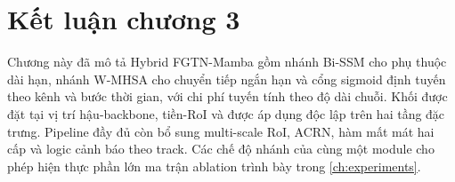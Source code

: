 \section*{Kết luận chương 3}

Chương này đã mô tả Hybrid FGTN-Mamba gồm nhánh Bi-SSM cho phụ thuộc dài hạn, nhánh W-MHSA cho chuyển tiếp ngắn hạn và cổng sigmoid định tuyến theo kênh và bước thời gian, với chi phí tuyến tính theo độ dài chuỗi. Khối được đặt tại vị trí hậu-backbone, tiền-RoI và được áp dụng độc lập trên hai tầng đặc trưng. Pipeline đầy đủ còn bổ sung multi-scale RoI, ACRN, hàm mất mát hai cấp và logic cảnh báo theo track. Các chế độ nhánh của cùng một module cho phép hiện thực phần lớn ma trận ablation trình bày trong \cref{ch:experiments}.

